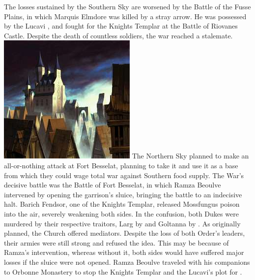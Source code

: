 The losses sustained by the Southern Sky are worsened by the Battle of the Fusse Plains, in which Marquis Elmdore was killed by a stray arrow. 
He was possessed by the Lucavi , and fought for the Knights Templar at the Battle of Riovanes Castle.
Despite the death of countless soldiers, the war reached a stalemate.
%
\ofpar
\includegraphics[width=\columnwidth]{./art/worldbook/riovanes.jpg}
\ofpar
% 
The Northern Sky planned to make an all-or-nothing attack at Fort Besselat, planning to take it and use it as a base from which they could wage total war against Southern food supply.
The War's decisive battle was the Battle of Fort Besselat, in which Ramza Beoulve intervened by opening the garrison's sluice, bringing the battle to an indecisive halt. 
Barich Fendsor, one of the Knights Templar, released Mossfungus poison into the air, severely weakening both sides. 
In the confusion, both Dukes were murdered by their respective traitors, Larg by  and Goltanna by . 
As originally planned, the Church offered mediators. 
Despite the loss of both Order's leaders, their armies were still strong and refused the idea. 
This may be because of Ramza's intervention, whereas without it, both sides would have suffered major losses if the sluice were not opened.
Ramza Beoulve traveled with his companions to Orbonne Monastery to stop the Knights Templar and the Lucavi's plot for . 
